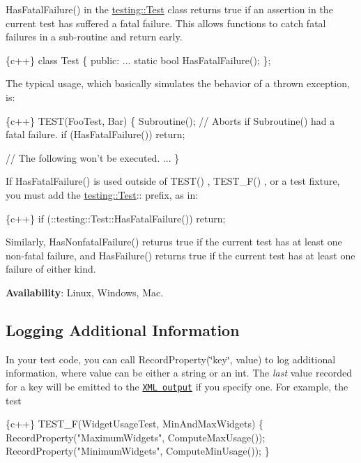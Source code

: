 {\ttfamily Has\+Fatal\+Failure()} in the {\ttfamily \mbox{\hyperlink{classtesting_1_1_test}{testing\+::\+Test}}} class returns {\ttfamily true} if an assertion in the current test has suffered a fatal failure. This allows functions to catch fatal failures in a sub-\/routine and return early.


\begin{DoxyCode}
\{c++\}
class Test \{
 public:
  ...
  static bool HasFatalFailure();
\};
\end{DoxyCode}


The typical usage, which basically simulates the behavior of a thrown exception, is\+:


\begin{DoxyCode}
\{c++\}
TEST(FooTest, Bar) \{
  Subroutine();
  // Aborts if Subroutine() had a fatal failure.
  if (HasFatalFailure()) return;

  // The following won't be executed.
  ...
\}
\end{DoxyCode}


If {\ttfamily Has\+Fatal\+Failure()} is used outside of {\ttfamily T\+E\+S\+T()} , {\ttfamily T\+E\+S\+T\+\_\+\+F()} , or a test fixture, you must add the {\ttfamily \mbox{\hyperlink{classtesting_1_1_test}{testing\+::\+Test}}\+:\+:} prefix, as in\+:


\begin{DoxyCode}
\{c++\}
if (::testing::Test::HasFatalFailure()) return;
\end{DoxyCode}


Similarly, {\ttfamily Has\+Nonfatal\+Failure()} returns {\ttfamily true} if the current test has at least one non-\/fatal failure, and {\ttfamily Has\+Failure()} returns {\ttfamily true} if the current test has at least one failure of either kind.

{\bfseries Availability}\+: Linux, Windows, Mac.

\subsection*{Logging Additional Information}

In your test code, you can call {\ttfamily Record\+Property(\char`\"{}key\char`\"{}, value)} to log additional information, where {\ttfamily value} can be either a string or an {\ttfamily int}. The {\itshape last} value recorded for a key will be emitted to the \href{#generating-an-xml-report}{\tt X\+ML output} if you specify one. For example, the test


\begin{DoxyCode}
\{c++\}
TEST\_F(WidgetUsageTest, MinAndMaxWidgets) \{
  RecordProperty("MaximumWidgets", ComputeMaxUsage());
  RecordProperty("MinimumWidgets", ComputeMinUsage());
\}
\end{DoxyCode}


